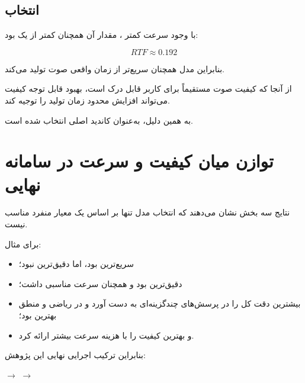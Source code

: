 \subsection{انتخاب }

با وجود سرعت کمتر ، مقدار  آن همچنان کمتر از یک بود:

\begin{equation}
RTF \approx 0.192
\end{equation}

بنابراین مدل همچنان سریع‌تر از زمان واقعی صوت تولید می‌کند.

از آنجا که کیفیت صوت مستقیماً برای کاربر قابل درک است،
بهبود قابل توجه کیفیت  می‌تواند افزایش محدود زمان تولید
را توجیه کند.

به همین دلیل،  به‌عنوان کاندید اصلی  انتخاب شده است.


\section{توازن میان کیفیت و سرعت در سامانه نهایی}

نتایج سه بخش نشان می‌دهند که انتخاب مدل تنها بر اساس یک معیار
منفرد مناسب نیست.

برای مثال:

\begin{itemize}

    \item {} سریع‌ترین  بود، اما دقیق‌ترین نبود؛

    \item {} دقیق‌ترین  بود و همچنان سرعت
    مناسبی داشت؛

    \item {} بیشترین دقت کل را در پرسش‌های چندگزینه‌ای
    به دست آورد و  در ریاضی و منطق بهترین بود؛

    \item و  بهترین کیفیت  را با هزینه سرعت بیشتر
    ارائه کرد.

\end{itemize}

بنابراین ترکیب اجرایی نهایی این پژوهش:

\begin{center}
$\longrightarrow$
$\longrightarrow$
\end{center}

